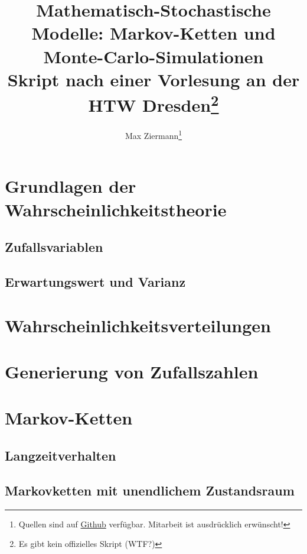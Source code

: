\documentclass{report}
\title{%
\huge\textbf{Mathematisch-Stochastische Modelle: Markov-Ketten und Monte-Carlo-Simulationen} \\
[2em]\large Skript nach einer Vorlesung an der HTW Dresden\thanks{Es gibt kein
offizielles Skript (WTF?)}}
\author{Max Ziermann\thanks{Quellen sind auf \href{https://github.com/burrscurr/msm}
{Github} verfügbar. Mitarbeit ist ausdrücklich erwünscht!}}
\theoremstyle{lemmastyle}
\begin{document}
  \maketitle

  \tableofcontents

  \chapter{Grundlagen der Wahrscheinlichkeitstheorie}
    
    \section{Zufallsvariablen}
    
    \section{Erwartungswert und Varianz}
    

  \chapter{Wahrscheinlichkeitsverteilungen}
    

  \chapter{Generierung von Zufallszahlen}
    

  \chapter{Markov-Ketten}
    
    \section{Langzeitverhalten}
    
    \section{Markovketten mit unendlichem Zustandsraum}
    

  \printbibliography
\end{document}
